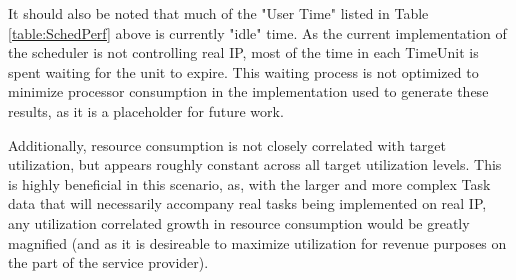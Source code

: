 It should also be noted that much of the "User Time" listed in Table \ref{table:SchedPerf} above is currently "idle" time. As the current implementation of the scheduler is not controlling real IP, most of the time in each TimeUnit is spent waiting for the unit to expire. This waiting process is not  optimized to minimize processor consumption in the implementation used to generate these results, as it is a placeholder for future work.

Additionally, resource consumption is not closely correlated with target utilization, but appears roughly constant across all target utilization levels. This is highly beneficial in this scenario, as, with the larger and more complex Task data that will necessarily accompany real tasks being implemented on real IP, any utilization correlated growth in resource consumption would be greatly magnified (and as it is desireable to maximize utilization for revenue purposes on the part of the service provider).